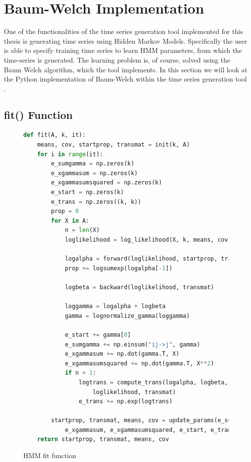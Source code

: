 
\chapter{Baum-Welch Implementation}\label{chapter:hmm-impl}

One of the functionalities of the time series generation tool implemented for this thesis is generating time series using Hidden Markov Models. Specifically the user is able to specify training time series to learn HMM parameters, from which the time-series is generated. The learning problem is, of course, solved using the Baum Welch algorithm, which the tool implements. In this section we will look at the Python implementation of Baum-Welch within the time series generation tool \parencite{tsgenerator}.

\section{fit() Function}

\begin{figure}
\begin{singlespace}
\begin{lstlisting}[language=Python]
def fit(A, k, it):
    means, cov, startprop, transmat = init(k, A)
    for i in range(it):
        e_sumgamma = np.zeros(k)
        e_xgammasum = np.zeros(k)
        e_xgammasumsquared = np.zeros(k)
        e_start = np.zeros(k)
        e_trans = np.zeros((k, k))
        prop = 0
        for X in A:
            n = len(X)
            loglikelihood = log_likelihood(X, k, means, cov)

            logalpha = forward(loglikelihood, startprop, transmat)
            prop += logsumexp(logalpha[-1])

            logbeta = backward(loglikelihood, transmat)

            loggamma = logalpha + logbeta
            gamma = lognormalize_gamma(loggamma)

            e_start += gamma[0]
            e_sumgamma += np.einsum("ij->j", gamma)
            e_xgammasum += np.dot(gamma.T, X)
            e_xgammasumsquared += np.dot(gamma.T, X**2)
            if n > 1:
                logtrans = compute_trans(logalpha, logbeta, \
                    loglikelihood, transmat)
                e_trans += np.exp(logtrans)

        startprop, transmat, means, cov = update_params(e_sumgamma, \
            e_xgammasum, e_xgammasumsquared, e_start, e_trans)
    return startprop, transmat, means, cov
\end{lstlisting}
\end{singlespace}
   
\caption{HMM fit function}    
\label{fig:hmm-fit-listing}
\end{figure}

